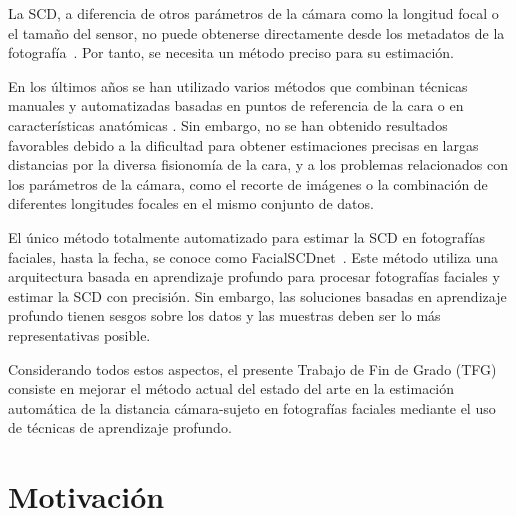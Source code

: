 La SCD, a diferencia de otros parámetros de la cámara como la longitud focal o el tamaño del sensor, no puede obtenerse directamente desde los metadatos de la fotografía~\cite{8}. Por tanto, se necesita un método preciso para su estimación. 


En los últimos años se han utilizado varios métodos que combinan técnicas manuales y automatizadas basadas en puntos de referencia de la cara o en características anatómicas \cite{28,30}. Sin embargo, no se han obtenido resultados favorables debido a la dificultad para obtener estimaciones precisas en largas distancias por la diversa fisionomía de la cara, y a los problemas relacionados con los parámetros de la cámara, como el recorte de imágenes o la combinación de diferentes longitudes focales en el mismo conjunto de datos.

El único método totalmente automatizado para estimar la SCD en fotografías faciales, hasta la fecha, se conoce como FacialSCDnet~\cite{14}. Este método utiliza una arquitectura basada en aprendizaje profundo para procesar fotografías faciales y estimar la SCD con precisión. Sin embargo, las soluciones basadas en aprendizaje profundo tienen sesgos sobre los datos y las muestras deben ser lo más representativas posible. 

Considerando todos estos aspectos, el presente Trabajo de Fin de Grado (TFG) consiste en mejorar el método actual del estado del arte en la estimación automática de la distancia cámara-sujeto en fotografías faciales mediante el uso de técnicas de aprendizaje profundo.


\section{Motivación}

